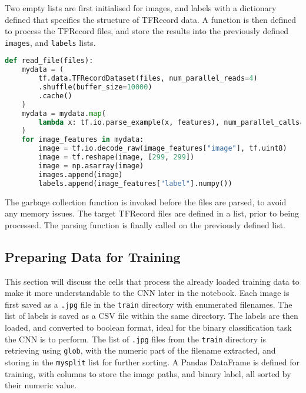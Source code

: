 \documentclass[../main]{subfiles}
\begin{document}
Two empty lists are first initialised for images, and labels with a dictionary
defined that specifies the structure of TFRecord data. A function is then
defined to process the TFRecord files, and store the results into the
previously defined \texttt{images}, and \texttt{labels} lists. 

\begin{lstlisting}[language=Python, caption={Data ingestion from TFRecord files.}]
def read_file(files):
    mydata = (
        tf.data.TFRecordDataset(files, num_parallel_reads=4)
        .shuffle(buffer_size=10000)
        .cache()
    )
    mydata = mydata.map(
        lambda x: tf.io.parse_example(x, features), num_parallel_calls=4
    )
    for image_features in mydata:
        image = tf.io.decode_raw(image_features["image"], tf.uint8)
        image = tf.reshape(image, [299, 299])
        image = np.asarray(image)
        images.append(image)
        labels.append(image_features["label"].numpy())
\end{lstlisting}

The garbage collection function is invoked before the files are parsed, to
avoid any memory issues. The target TFRecord files are defined in a list, prior
to being processed. The parsing function is finally called on the previously
defined list.

\subsection{Preparing Data for Training}
This section will discuss the cells that process the already loaded training
data to make it more understandable to the CNN later in the notebook. Each
image is first saved as a \texttt{.jpg} file in the \texttt{train} directory
with enumerated filenames. The list of labels is saved as a CSV file within the
same directory. The labels are then loaded, and converted to boolean format,
ideal for the binary classification task the CNN is to perform. The list of
\texttt{.jpg} files from the \texttt{train} directory is retrieving using
\texttt{glob}, with the numeric part of the filename extracted, and storing in
the \texttt{mysplit} list for further sorting. A Pandas DataFrame is defined
for training, with columns to store the image paths, and binary label, all
sorted by their numeric value.
\end{document}
